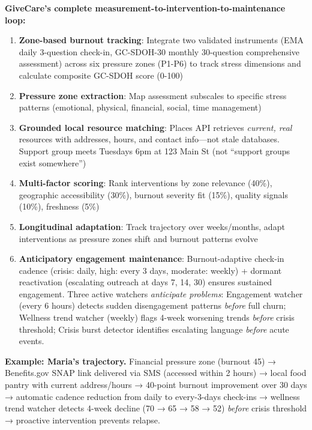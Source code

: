 \documentclass{article}
\begin{document}
\textbf{GiveCare's complete measurement-to-intervention-to-maintenance loop:}

\begin{enumerate}
    \item \textbf{Zone-based burnout tracking}: Integrate two validated instruments (EMA daily 3-question check-in, GC-SDOH-30 monthly 30-question comprehensive assessment) across six pressure zones (P1-P6) to track stress dimensions and calculate composite GC-SDOH score (0-100)
    \item \textbf{Pressure zone extraction}: Map assessment subscales to specific stress patterns (emotional, physical, financial, social, time management)
    \item \textbf{Grounded local resource matching}: Places API retrieves \textit{current, real} resources with addresses, hours, and contact info—not stale databases. Support group meets Tuesdays 6pm at 123 Main St (not ``support groups exist somewhere'')
    \item \textbf{Multi-factor scoring}: Rank interventions by zone relevance (40\%), geographic accessibility (30\%), burnout severity fit (15\%), quality signals (10\%), freshness (5\%)
    \item \textbf{Longitudinal adaptation}: Track trajectory over weeks/months, adapt interventions as pressure zones shift and burnout patterns evolve
    \item \textbf{Anticipatory engagement maintenance}: Burnout-adaptive check-in cadence (crisis: daily, high: every 3 days, moderate: weekly) + dormant reactivation (escalating outreach at days 7, 14, 30) ensures sustained engagement. Three active watchers \textit{anticipate problems}: Engagement watcher (every 6 hours) detects sudden disengagement patterns \textit{before} full churn; Wellness trend watcher (weekly) flags 4-week worsening trends \textit{before} crisis threshold; Crisis burst detector identifies escalating language \textit{before} acute events.
\end{enumerate}

\textbf{Example: Maria's trajectory.} Financial pressure zone (burnout 45) → Benefits.gov SNAP link delivered via SMS (accessed within 2 hours) → local food pantry with current address/hours → 40-point burnout improvement over 30 days → automatic cadence reduction from daily to every-3-days check-ins → wellness trend watcher detects 4-week decline (70 → 65 → 58 → 52) \textit{before} crisis threshold → proactive intervention prevents relapse.
\end{document}
